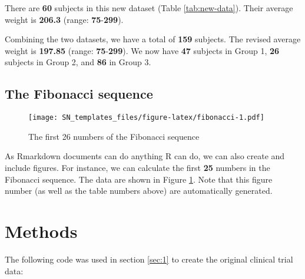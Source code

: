 \documentclass[smallextended]{svjour3}       %
\begin{document}
There are \textbf{60} subjects in this new dataset (Table \ref{tab:new-data}). Their average weight is \textbf{206.3} (range: \textbf{75}-\textbf{299}).

Combining the two datasets, we have a total of \textbf{159} subjects. The revised average weight is \textbf{197.85} (range: \textbf{75}-\textbf{299}). We now have \textbf{47} subjects in Group 1, \textbf{26} subjects in Group 2, and \textbf{86} in Group 3.

\hypertarget{sec:2}{%
\subsection{The Fibonacci sequence}\label{sec:2}}

\begin{figure}
\centering
\texttt{[image: SN\_templates\_files/figure-latex/fibonacci-1.pdf]}
\caption{\label{fig:fibonacci}The first 26 numbers of the Fibonacci sequence}
\end{figure}

As Rmarkdown documents can do anything R can do, we can also create and include figures. For instance, we can calculate the first \textbf{25} numbers in the Fibonacci sequence. The data are shown in Figure \ref{fig:fibonacci}. Note that this figure number (as well as the table numbers above) are automatically generated.

\hypertarget{methods}{%
\section{Methods}\label{methods}}

The following code was used in section \ref{sec:1} to create the original clinical trial data:
\end{document}
